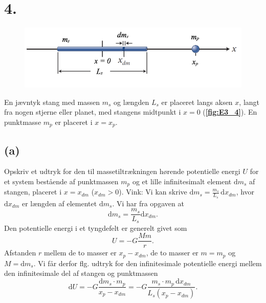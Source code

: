 \documentclass[12pt]{article}
\theoremstyle{definition}
\begin{document}
\section*{4.}
\begin{figure} [ht]
  \centering
  \caption{}
  \includegraphics[width=0.5\linewidth]{../figures/E3_4.png}
  \label{fig:E3_4}
\end{figure}

En jævntyk stang med massen $m_s$ og længden $L_s$ er placeret langs aksen $x$, langt fra nogen stjerne eller planet, med stangens midtpunkt i $x = 0$ (\textbf{\autoref{fig:E3_4}}). En punktmasse $m_p$ er placeret i $x = x_p$.

\subsection*{(a)}
Opskriv et udtryk for den til massetiltrækningen hørende potentielle energi $U$ for et system bestående af punktmassen $m_p$ og et lille infinitesimalt element $\mathrm{d}m_s$ af stangen, placeret i $x = x_{dm}$ ($x_{dm} > 0$). Vink: Vi kan skrive $\mathrm{d}m_s = \frac{m_s}{L_s} \, \mathrm{d}x_{dm}$, hvor $\mathrm{d}x_{dm}$ er længden af elementet $\mathrm{d}m_s$.
\bigbreak
Vi har fra opgaven at
\[ 
  \mathrm{d}m_s = \frac{m_s}{L_s}\mathrm{d}x_{dm}
.\]
Den potentielle energi i et tyngdefelt er generelt givet som
\[ 
U = - G \frac{Mm}{r}
.\]
Afstanden $r$ mellem de to masser er $x_p - x_{dm}$, de to masser er $m = m_p$ og $M = \mathrm{d}m_s$. Vi får derfor flg. udtryk for den infinitesimale potentielle energi mellem den infinitesimale del af stangen og punktmassen
\[ 
\mathrm{d}U = -G \frac{\mathrm{d}m_s \cdot m_p}{x_p - x_{dm}} = - G \frac{m_s \cdot m_p \, \mathrm{d}x_{dm}}{L_s(x_p - x_{dm})}
.\]
\end{document}
